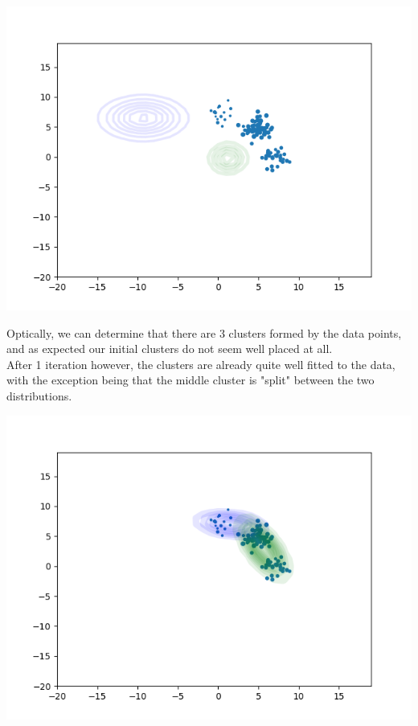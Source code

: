 \documentclass[11pt,a4paper]{article}
\begin{document}
\begin{center}
\includegraphics[width=\textwidth]{1_k=2.png}
\end{center}


Optically, we can determine that there are 3 clusters formed by the data points, and as expected our initial clusters do not seem well placed at all.\\

After 1 iteration however,  the clusters are already quite well fitted to the data, with the exception being that the middle cluster is "split" between the two distributions.\\

\begin{center}
\includegraphics[width=\textwidth]{2_k=2.png}
\end{center}
\end{document}
